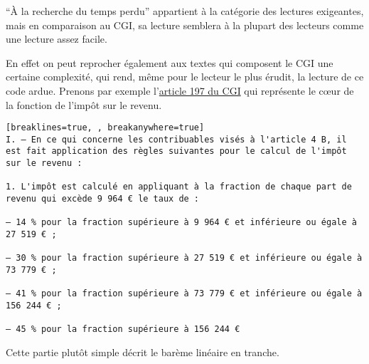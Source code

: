 ``À la recherche du temps perdu'' appartient à la catégorie des lectures
exigeantes, mais en comparaison au CGI, sa lecture semblera à la plupart
des lecteurs comme une lecture assez facile.

En effet on peut reprocher également aux textes qui composent le CGI une
certaine complexité, qui rend, même pour le lecteur le plus érudit, la
lecture de ce code ardue. Prenons par exemple
l'\href{https://www.legifrance.gouv.fr/affichCodeArticle.do;jsessionid=CED4C30B33698CC4FB699FB4C30E13CE.tplgfr34s_1?idArticle=LEGIARTI000037985566\&cidTexte=LEGITEXT000006069577\&dateTexte=20190422}{article
197 du CGI} qui représente le cœur de la fonction de l'impôt sur le
revenu.


\begin{Verbatim}[breaklines=true, , breakanywhere=true]
I. – En ce qui concerne les contribuables visés à l'article 4 B, il est fait application des règles suivantes pour le calcul de l'impôt sur le revenu :

1. L'impôt est calculé en appliquant à la fraction de chaque part de revenu qui excède 9 964 € le taux de :

– 14 % pour la fraction supérieure à 9 964 € et inférieure ou égale à 27 519 € ;

– 30 % pour la fraction supérieure à 27 519 € et inférieure ou égale à 73 779 € ;

– 41 % pour la fraction supérieure à 73 779 € et inférieure ou égale à 156 244 € ;

– 45 % pour la fraction supérieure à 156 244 €
\end{Verbatim}

Cette partie plutôt simple décrit le barème linéaire en tranche.

